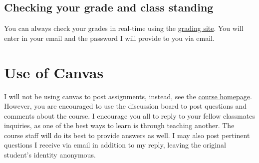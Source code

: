 \documentclass[12pt]{article}
\newcommand{\coursewebpage}{\href{https://github.com/kapelner/Wharton_Stat_422_722}{course homepage}}
\begin{document}
%
%
%
%

\subsection*{Checking your grade and class standing}

You can always check your grades in real-time using the \href{http://wharton.gradesly.com}{grading site}. You will enter in your email and the password I will provide to you via email.

\section*{Use of Canvas}
I will not be using canvas to post assignments, instead, see the \coursewebpage. However, you are encouraged to use the discussion board to post questions and comments about the course. I encourage you all to reply to your fellow classmates inquiries, as one of the best ways to learn is through teaching another. The course staff will do its best to provide answers as well. I may also post pertinent questions I receive via email in addition to my reply, leaving the original student's identity anonymous. 
\end{document}
